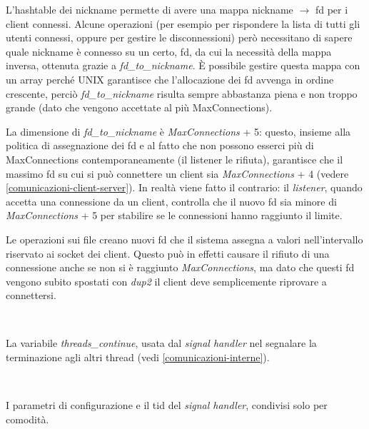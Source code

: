 \documentclass[a4paper]{article}
\theoremstyle{theorem}
\theoremstyle{remark}
\theoremstyle{definition}
\theoremstyle{corollary}
\theoremstyle{lemma}
\newcommand\codeName[1]{%
	\textit{#1}}
\begin{document}
L'hashtable dei nickname permette di avere una mappa nickname $\rightarrow$ fd per i client connessi. Alcune operazioni (per esempio per rispondere la lista di tutti gli utenti connessi, oppure per gestire le disconnessioni) però necessitano di sapere quale nickname è connesso su un certo, fd, da cui la necessità della mappa inversa, ottenuta grazie a \codeName{fd\_to\_nickname}. È possibile gestire questa mappa con un array perché UNIX garantisce che l'allocazione dei fd avvenga in ordine crescente, perciò \codeName{fd\_to\_nickname} risulta sempre abbastanza piena e non troppo grande (dato che vengono accettate al più MaxConnections).

La dimensione di \codeName{fd\_to\_nickname} è \codeName{MaxConnections} + 5: questo, insieme alla politica di assegnazione dei fd e al fatto che non possono esserci più di MaxConnections contemporaneamente (il listener le rifiuta), garantisce che il massimo fd su cui si può connettere un client sia \codeName{MaxConnections} + 4 (vedere \autoref{comunicazioni-client-server}). In realtà viene fatto il contrario: il \codeName{listener}, quando accetta una connessione da un client, controlla che il nuovo fd sia minore di \codeName{MaxConnections} + 5 per stabilire se le connessioni hanno raggiunto il limite.

Le operazioni sui file creano nuovi fd che il sistema assegna a valori nell'intervallo riservato ai socket dei client. Questo può in effetti causare il rifiuto di una connessione anche se non si è raggiunto \codeName{MaxConnections}, ma dato che questi fd vengono subito spostati con \codeName{dup2} il client deve semplicemente riprovare a connettersi.

\

La variabile \codeName{threads\_continue}, usata dal \codeName{signal handler} nel segnalare la terminazione agli altri thread (vedi \autoref{comunicazioni-interne}).

\

I parametri di configurazione e il tid del \codeName{signal handler}, condivisi solo per comodità.
\end{document}

